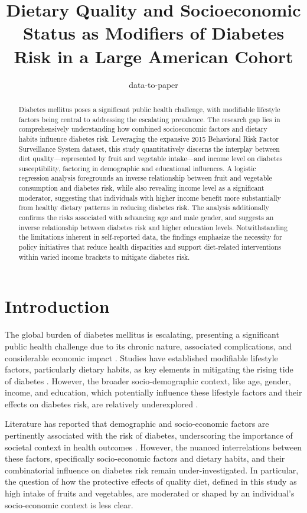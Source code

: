 \documentclass[11pt]{article}
\title{Dietary Quality and Socioeconomic Status as Modifiers of Diabetes Risk in a Large American Cohort}
\author{data-to-paper}
\begin{document}
\maketitle
\begin{abstract}
Diabetes mellitus poses a significant public health challenge, with modifiable lifestyle factors being central to addressing the escalating prevalence. The research gap lies in comprehensively understanding how combined socioeconomic factors and dietary habits influence diabetes risk. Leveraging the expansive 2015 Behavioral Risk Factor Surveillance System dataset, this study quantitatively discerns the interplay between diet quality—represented by fruit and vegetable intake—and income level on diabetes susceptibility, factoring in demographic and educational influences. A logistic regression analysis foregrounds an inverse relationship between fruit and vegetable consumption and diabetes risk, while also revealing income level as a significant moderator, suggesting that individuals with higher income benefit more substantially from healthy dietary patterns in reducing diabetes risk. The analysis additionally confirms the risks associated with advancing age and male gender, and suggests an inverse relationship between diabetes risk and higher education levels. Notwithstanding the limitations inherent in self-reported data, the findings emphasize the necessity for policy initiatives that reduce health disparities and support diet-related interventions within varied income brackets to mitigate diabetes risk.
\end{abstract}
\section*{Introduction}

The global burden of diabetes mellitus is escalating, presenting a significant public health challenge due to its chronic nature, associated complications, and considerable economic impact \cite{Akter2014PrevalenceOD}. Studies have established modifiable lifestyle factors, particularly dietary habits, as key elements in mitigating the rising tide of diabetes \cite{Bazzano2008IntakeOF, Carter2010FruitAV}. However, the broader socio-demographic context, like age, gender, income, and education, which potentially influence these lifestyle factors and their effects on diabetes risk, are relatively underexplored \cite{Seiglie2020DiabetesPA, Chan1994ObesityFD}.

Literature has reported that demographic and socio-economic factors are pertinently associated with the risk of diabetes, underscoring the importance of societal context in health outcomes \cite{Duan2022EffectsOE}. However, the nuanced interrelations between these factors, specifically socio-economic factors and dietary habits, and their combinatorial influence on diabetes risk remain under-investigated. In particular, the question of how the protective effects of quality diet, defined in this study as high intake of fruits and vegetables, are moderated or shaped by an individual's socio-economic context is less clear.
\end{document}
